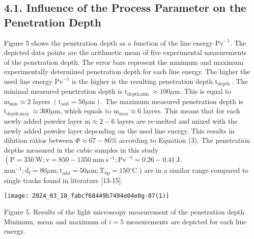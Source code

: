 \documentclass[10pt]{article}
\begin{document}
\subsection*{4.1. Influence of the Process Parameter on the Penetration Depth}
Figure 5 shows the penetration depth as a function of the line energy $\mathrm{Pv}^{-1}$. The depicted data points are the arithmetic mean of five experimental measurements of the penetration depth. The error bars represent the minimum and maximum experimentally determined penetration depth for each line energy. The higher the used line energy $\mathrm{Pv}^{-1}$ is the higher is the resulting penetration depth $\mathrm{t}_{\text {depth }}$. The minimal measured penetration depth is $\mathrm{t}_{\text {depth,min }} \approx 100 \mu \mathrm{m}$. This is equal to $\mathrm{m}_{\min } \approx 2$ layers $\left(\mathrm{t}_{\mathrm{add}}=50 \mu \mathrm{m}\right)$. The maximum measured penetration depth is $\mathrm{t}_{\text {depth,max }} \approx 300 \mu \mathrm{m}$, which equals to $\mathrm{m}_{\max } \approx 6$ layers. This means that for each newly added powder layer $\mathrm{m} \approx 2-6$ layers are re-melted and mixed with the newly added powder layer depending on the used line energy. This results in dilution ratios between $\Phi \approx 67-86 \%$ according to Equation (3). The penetration depths measured in the cubic samples in this study $\left(\mathrm{P}=350 \mathrm{~W} ; \mathrm{v}=850-1350 \mathrm{~mm} \mathrm{~s}^{-1} ; \mathrm{Pv}^{-1}=0.26-0.41 \mathrm{~J}\right.$. $\mathrm{mm}^{-1} ; \mathrm{d}_{\mathrm{f}}=80 \mu \mathrm{m} ; \mathrm{t}_{\mathrm{add}}=50 \mu \mathrm{m} ; \mathrm{T}_{\mathrm{bp}}=150{ }^{\circ} \mathrm{C}$ ) are in a similar range compared to single tracks found in literature [13-15].

\begin{center}
\texttt{[image: 2024\_03\_10\_fabcf68449b7494e04e0g-07(1)]}
\end{center}

Figure 5. Results of the light microscopy measurement of the penetration depth. Minimum, mean and maximum of $i=5$ measurements are depicted for each line energy.
\end{document}
